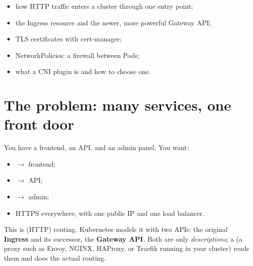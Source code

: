 
\begin{objectives}
\begin{itemize}
  \item how HTTP traffic enters a cluster through one entry point;
  \item the Ingress resource and the newer, more powerful Gateway API;
  \item TLS certificates with cert-manager;
  \item NetworkPolicies: a firewall between Pods;
  \item what a CNI plugin is and how to choose one.
\end{itemize}
\end{objectives}

\section{The problem: many services, one front door}

You have a frontend, an API, and an admin panel. You want:

\begin{itemize}
  \item {} $\rightarrow$ frontend;
  \item {} $\rightarrow$ API;
  \item {} $\rightarrow$ admin;
  \item HTTPS everywhere, with one public IP and one load balancer.
\end{itemize}

This is  (HTTP) routing. Kubernetes models it with two APIs:
the original \textbf{Ingress} and its successor, the \textbf{Gateway API}.
Both are only \emph{descriptions}; a  (a proxy such as
Envoy, NGINX, HAProxy, or Traefik running in your cluster) reads them and
does the actual routing.

